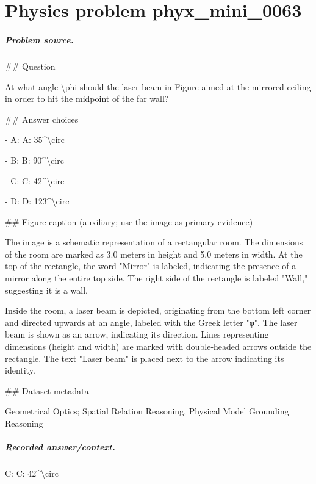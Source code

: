 
\chapter{Physics problem phyx\_mini\_0063}
\label{ch:PhyXMiniProblems_problem_phyx_mini_0063}

\paragraph{Problem source.}
\#\# Question

At what angle \textbackslash{}phi should the laser beam in Figure aimed at the mirrored ceiling in order to hit the midpoint of the far wall?

\#\# Answer choices

- A: A: 35\textasciicircum{}\textbackslash{}circ

- B: B: 90\textasciicircum{}\textbackslash{}circ

- C: C: 42\textasciicircum{}\textbackslash{}circ

- D: D: 123\textasciicircum{}\textbackslash{}circ

\#\# Figure caption (auxiliary; use the image as primary evidence)

The image is a schematic representation of a rectangular room. The dimensions of the room are marked as 3.0 meters in height and 5.0 meters in width. At the top of the rectangle, the word "Mirror" is labeled, indicating the presence of a mirror along the entire top side. The right side of the rectangle is labeled "Wall," suggesting it is a wall.

Inside the room, a laser beam is depicted, originating from the bottom left corner and directed upwards at an angle, labeled with the Greek letter "φ". The laser beam is shown as an arrow, indicating its direction. Lines representing dimensions (height and width) are marked with double-headed arrows outside the rectangle. The text "Laser beam" is placed next to the arrow indicating its identity.

\#\# Dataset metadata

Geometrical Optics; Spatial Relation Reasoning, Physical Model Grounding Reasoning

\paragraph{Recorded answer/context.}
C: C: 42\textasciicircum{}\textbackslash{}circ

